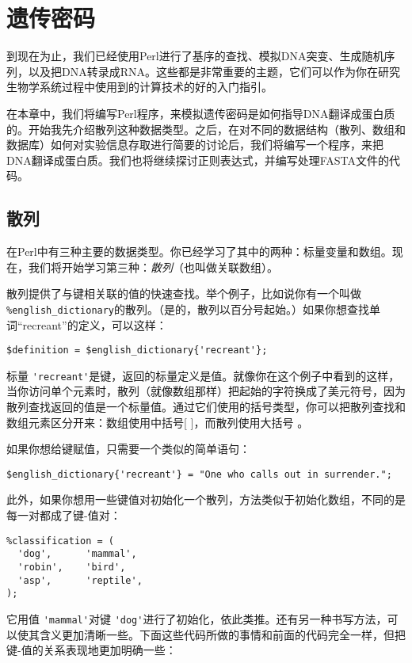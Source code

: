 \chapter{遗传密码}
\label{chap:chapter8}
\minitoc

到现在为止，我们已经使用Perl进行了基序的查找、模拟DNA突变、生成随机序列，以及把DNA转录成RNA。这些都是非常重要的主题，它们可以作为你在研究生物学系统过程中使用到的计算技术的好的入门指引。

在本章中，我们将编写Perl程序，来模拟遗传密码是如何指导DNA翻译成蛋白质的。开始我先介绍散列这种数据类型。之后，在对不同的数据结构（散列、数组和数据库）如何对实验信息存取进行简要的讨论后，我们将编写一个程序，来把DNA翻译成蛋白质。我们也将继续探讨正则表达式，并编写处理FASTA文件的代码。

\section{散列}
在Perl中有三种主要的数据类型。你已经学习了其中的两种：标量变量和数组。现在，我们将开始学习第三种：\textit{散列}（也叫做关联数组）。

散列提供了与键相关联的值的快速查找。举个例子，比如说你有一个叫做 \verb|%english_dictionary|的散列。（是的，散列以百分号起始。）如果你想查找单词“recreant”的定义，可以这样：

\begin{lstlisting}
$definition = $english_dictionary{'recreant'};
\end{lstlisting}

标量 \verb|'recreant'|是键，返回的标量定义是值。就像你在这个例子中看到的这样，当你访问单个元素时，散列（就像数组那样）把起始的字符换成了美元符号，因为散列查找返回的值是一个标量值。通过它们使用的括号类型，你可以把散列查找和数组元素区分开来：数组使用中括号[ ]，而散列使用大括号{ }。

如果你想给键赋值，只需要一个类似的简单语句：

\begin{lstlisting}
$english_dictionary{'recreant'} = "One who calls out in surrender.";
\end{lstlisting}

此外，如果你想用一些键值对初始化一个散列，方法类似于初始化数组，不同的是每一对都成了键-值对：

\begin{lstlisting}
%classification = (
  'dog',      'mammal',
  'robin',    'bird',
  'asp',      'reptile',
);
\end{lstlisting}

它用值 \verb|'mammal'|对键 \verb|'dog'|进行了初始化，依此类推。还有另一种书写方法，可以使其含义更加清晰一些。下面这些代码所做的事情和前面的代码完全一样，但把键-值的关系表现地更加明确一些：

